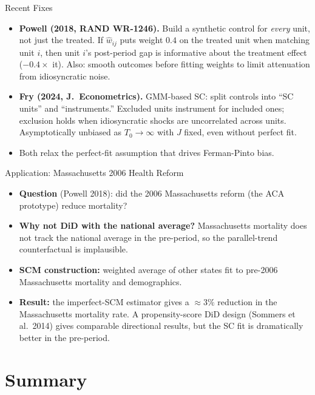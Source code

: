 \documentclass[aspectratio=169, handout]{beamer}
\numberwithin{equation}{section}
\begin{document}
\begin{frame}{Recent Fixes}
\begin{itemize}
\item \textbf{Powell (2018, RAND WR-1246).} Build a synthetic control for \emph{every} unit, not just the treated. If $\hat w_{ij}$ puts weight $0.4$ on the treated unit when matching unit $i$, then unit $i$'s post-period gap is informative about the treatment effect ($-0.4\times$ it). Also: smooth outcomes before fitting weights to limit attenuation from idiosyncratic noise.
\item \textbf{Fry (2024, J.\ Econometrics).} GMM-based SC: split controls into ``SC units'' and ``instruments.'' Excluded units instrument for included ones; exclusion holds when idiosyncratic shocks are uncorrelated across units. Asymptotically unbiased as $T_0\to\infty$ with $J$ fixed, even without perfect fit.
\item Both relax the perfect-fit assumption that drives Ferman-Pinto bias.
\end{itemize}
\end{frame}

\begin{frame}{Application: Massachusetts 2006 Health Reform}
\begin{itemize}
\item \textbf{Question} (Powell 2018): did the 2006 Massachusetts reform (the ACA prototype) reduce mortality?
\item \textbf{Why not DiD with the national average?} Massachusetts mortality does not track the national average in the pre-period, so the parallel-trend counterfactual is implausible.
\item \textbf{SCM construction:} weighted average of other states fit to pre-2006 Massachusetts mortality and demographics.
\item \textbf{Result:} the imperfect-SCM estimator gives a $\approx 3\%$ reduction in the Massachusetts mortality rate. A propensity-score DiD design (Sommers et al.\ 2014) gives comparable directional results, but the SC fit is dramatically better in the pre-period.
\end{itemize}
\end{frame}

\section{Summary}
\setcounter{subsection}{1}
\end{document}
